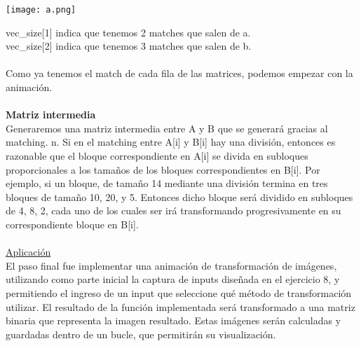 \documentclass{article}
\begin{document}
		\begin{center}
			\texttt{[image: a.png]}
		\end{center}
		vec\_size[1] indica que tenemos 2 matches que salen de a.\\
		vec\_size[2] indica que tenemos 3 matches que salen de b.\\\\
		Como ya tenemos el match de cada fila de las matrices, podemos empezar con la animación. \\\\
		\textbf{Matriz intermedia}\\
		Generaremos una matriz intermedia entre A y B que se generará gracias al matching. 
		n. Si en el matching entre A[i] y B[i] hay una división, entonces es razonable que el bloque correspondiente en A[i] se divida en subloques proporcionales a los tamaños de los bloques correspondientes en B[i]. Por ejemplo, si un bloque, de tamaño 14 mediante una división termina en tres bloques de tamaño 10, 20, y 5. Entonces dicho bloque será dividido en subloques de 4, 8, 2, cada uno de los cuales ser irá transformando progresivamente en su correspondiente bloque en B[i].
		\\\\
		\underline{Aplicación}\\ 
		El paso final fue implementar una animación de transformación de imágenes, utilizando como parte inicial la captura de inputs diseñada en el ejercicio 8, y permitiendo el ingreso de un input que seleccione qué método de transformación utilizar. El resultado de la función implementada será transformado a una matriz binaria que representa la imagen resultado. Estas imágenes serán calculadas y guardadas dentro de un bucle, que permitirán su visualización.\\\\
\end{document}
